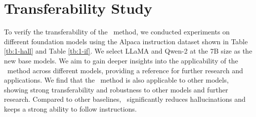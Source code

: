 \begin{table}
\scriptsize	
\centering
{}
\caption{FactScore results on BioGEN with different temperature $T$ during the response generation. 
We conduct the experiments on LLaMA-3-8B and use 5\% selected instruction data from different datasets.}
\label{tb:para} 
\end{table}



\section{Transferability Study}
\label{appendix:trans}
To verify the transferability of the \OURS~method, we conducted experiments on different foundation models using the Alpaca instruction dataset shown in Table \ref{tb:1-hall} and Table \ref{tb:1-if}.
We select LLaMA \citep{llama1} and Qwen-2 \citep{yang2024qwen2technicalreport} at the 7B size as the new base models.
We aim to gain deeper insights into the applicability of the \OURS~method across different models, providing a reference for further research and applications. 
We find that the \OURS~method is also applicable to other models, showing strong transferability and robustness to other models and further research.
Compared to other baselines, \OURS~significantly reduces hallucinations and keeps a strong ability to follow instructions.




